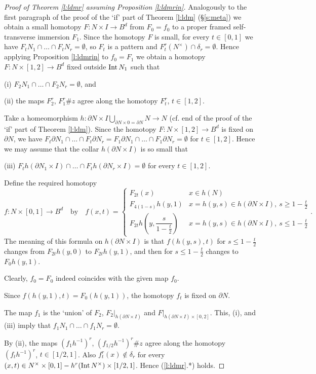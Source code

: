 \documentclass[12pt]{article}
\def\diag{\delta}
\def\Int{\mathop{\fam0 Int}}
\theoremstyle{plain}
\theoremstyle{definition}
\begin{document}
\begin{proof}[Proof of Theorem \ref{l:ldmr} assuming Proposition \ref{l:ldmrin}]
Analogously to the first paragraph of the proof of the `if' part of Theorem \ref{l:ldm} (\S\ref{s:meta})
we obtain a small homotopy $F:N\times I\to B^d$ from $F_0=f_0$ to a proper framed self-transverse immersion $F_1$.
Since the homotopy $F$ is small, for every $t\in[0,1]$ we have $F_tN_1\cap\ldots\cap F_tN_r=\emptyset$, so
$F_t$ is a pattern and $F_t^r(N^\times)\cap\diag_r=\emptyset$.
Hence applying Proposition \ref{l:ldmrin} to $f_0=F_1$ we obtain a homotopy $F:N\times[1,2]\to B^d$
fixed outside $\Int N_1$ such that

(i) $F_2N_1\cap\ldots\cap F_2N_r=\emptyset$, and

(ii) the maps $F_2^r$, $F_1^r\#z$ agree along the homotopy $F_t^r$, $t\in[1,2]$.

Take a homeomorphism $h: \partial N\times I \bigcup\limits_{\partial N\times0=\partial N} N \to N$
(cf. end of the proof of the `if' part of Theorem \ref{l:ldm}).
Since the homotopy $F:N\times[1,2]\to B^d$ is fixed on $\partial N$, we have
$F_t\partial N_1\cap\ldots\cap F_t\partial N_r=F_1\partial N_1\cap\ldots\cap F_1\partial N_r=\emptyset$ for $t\in[1,2]$.
Hence we may assume that the collar $h(\partial N\times I)$ is so small that

(iii) $F_th(\partial N_1\times I)\cap\ldots\cap F_th(\partial N_r\times I)=\emptyset$ for every $t\in[1,2]$.

Define the required homotopy
$$f:N\times[0,1]\to B^d\quad\text{by}\quad
f(x,t)=\begin{cases} F_{2t}(x) & x\in h(N) \\
F_{4(1-s)}h(y,1) & x=h(y,s)\in h(\partial N\times I),\ s\ge1-\frac t2 \\
F_{2t}h\left(y,\dfrac s{1-\frac t2}\right)& x=h(y,s)\in h(\partial N\times I),\ s\le1-\frac t2
\end{cases}.$$
The meaning of this formula on $h(\partial N\times I)$ is that $f(h(y,s),t)$ for $s\le1-\frac t2$
changes from $F_{2t}h(y,0)$ to $F_{2t}h(y,1)$, and then for $s\le1-\frac t2$ changes to $F_0h(y,1)$.

Clearly, $f_0=F_0$ indeed coincides with the given map $f_0$.

Since $f(h(y,1),t)=F_0(h(y,1))$, the homotopy $f_t$ is fixed on $\partial N$.

The map $f_1$ is the `union' of $F_2$, $F_2|_{h(\partial N\times I)}$ and
$F|_{h(\partial N\times I)\times[0,2]}$.
This, (i), and (iii) imply that $f_1N_1\cap\ldots\cap f_1N_r=\emptyset$.

By (ii), the maps $(f_1h^{-1})^r$, $(f_{1/2}h^{-1})^r\#z$ agree along the homotopy
$(f_th^{-1})^r$, $t\in[1/2,1]$.
Also $f_t^r(x)\not\in\delta_r$ for every $(x,t)\in N^\times\times[0,1]-h^r(\Int N^\times)\times[1/2,1]$.
Hence (\ref{l:ldmr}.*) holds.
\end{proof}
\end{document}

